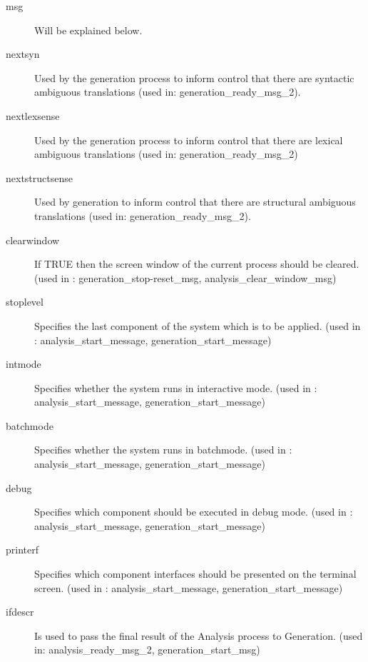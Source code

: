 \begin{description}
   \item[msg] Will be explained below.
   \item[nextsyn] Used by the generation process to inform control that there
                  are syntactic ambiguous translations
                  (used in: generation\_ready\_msg\_2).
   \item[nextlexsense] Used by the generation process to inform control that
                  there are lexical ambiguous translations
                   (used in: generation\_ready\_msg\_2)
   \item[nextstructsense] Used by generation to inform control that there 
                  are structural ambiguous translations
                   (used in: generation\_ready\_msg\_2).
   \item[clearwindow] If TRUE then the screen window of the current process 
           should 
           be cleared. (used in : generation\_stop-reset\_msg,
           analysis\_clear\_window\_msg)
   \item[stoplevel] Specifies the last component of the system which is to be 
           applied. 
           (used in : analysis\_start\_message, 
           generation\_start\_message)
   \item[intmode] Specifies whether the system  runs in 
           interactive mode.
           (used in : analysis\_start\_message, 
           generation\_start\_message)
    \item[batchmode] Specifies whether the system  runs in 
           batchmode.
           (used in : analysis\_start\_message, 
           generation\_start\_message)
   \item[debug] Specifies which component should be executed in debug mode.
           (used in : analysis\_start\_message, 
           generation\_start\_message)
   \item[printerf] Specifies which component interfaces should be presented on
           the terminal screen.
           (used in : analysis\_start\_message, 
           generation\_start\_message)
   \item[ifdescr] Is used to pass the final result of the Analysis process to
           Generation. (used in: analysis\_ready\_msg\_2, 
           generation\_start\_msg)
\end{description}

